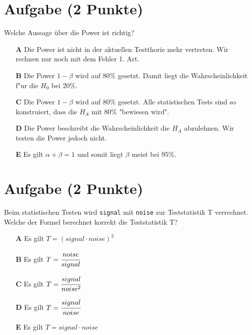 \documentclass[a4paper, 10pt]{scrartcl}\usepackage[]{graphicx}\usepackage[]{xcolor}
\begin{document}
\section{Aufgabe \hfill (2 Punkte)}

Welche Aussage {\"u}ber die Power ist richtig?



\begin{enumerate}
\item [\textbf{A} \msquare] Die Power ist nicht in der aktuellen Testthorie mehr vertreten. Wir rechnen nur noch mit dem Fehler 1. Art.
\item [\textbf{B} \msquare] Die Power $1-\beta$ wird auf 80\% gesetzt. Damit liegt die Wahrscheinlichkeit f{"u}r die $H_0$ bei 20\%.
\item [\textbf{C} \msquare] Die Power $1-\beta$ wird auf 80\% gesetzt. Alle statistischen Tests sind so konstruiert, dass die $H_A$ mit 80\% "bewiesen wird".
\item [\textbf{D} \msquare] Die Power beschreibt die Wahrscheinlichkeit die $H_A$ abzulehnen. Wir testen die Power jedoch nicht.
\item [\textbf{E} \msquare] Es gilt $\alpha + \beta = 1$ und somit liegt $\beta$ meist bei 95\%.
\end{enumerate}

\section{Aufgabe \hfill (2 Punkte)}

Beim statistischen Testen wird \texttt{signal} mit \texttt{noise} zur
Teststatistik T verrechnet. Welche der Formel berechnet korrekt die
Teststatistik T?



\begin{enumerate}
\item [\textbf{A} \msquare] Es gilt $T = (signal \cdot noise)^2$
\item [\textbf{B} \msquare] Es gilt $T = \cfrac{noise}{signal}$
\item [\textbf{C} \msquare] Es gilt $T = \cfrac{signal}{noise^2}$
\item [\textbf{D} \msquare] Es gilt $T = \cfrac{signal}{noise}$
\item [\textbf{E} \msquare] Es gilt $T = signal \cdot noise$
\end{enumerate}

\end{document}
